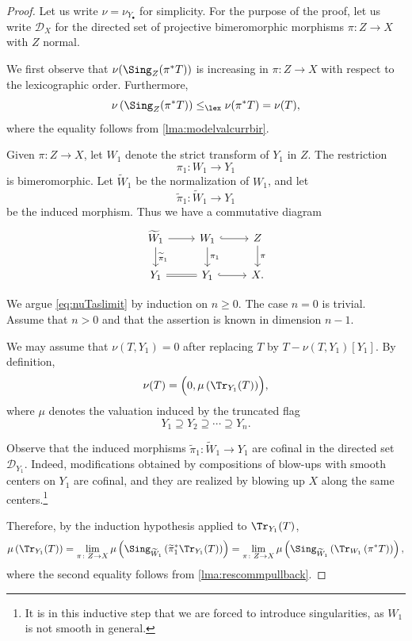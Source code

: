 \begin{proof}
Let us write $\nu=\nu_{Y_{\bullet}}$ for simplicity. For the purpose of the proof,
let us write $\mathcal{D}_X$ for the directed set of projective bimeromorphic
morphisms $\pi\colon Z\rightarrow X$ with $Z$ normal.


We first observe that $\nu(\Sing_Z(\pi^*T))$ is increasing in $\pi\colon Z\rightarrow X$ with respect to the lexicographic order. Furthermore,
\[
    \nu\left(\Sing_Z(\pi^*T)\right)\leq_{\lex} \nu(\pi^*T)=\nu(T),
\]
where the equality follows from \cref{lma:modelvalcurrbir}.

Given $\pi\colon Z\rightarrow X$, let $W_1$ denote the strict transform of $Y_1$ in
$Z$. The restriction
\[
    \pi_1\colon W_1\rightarrow Y_1
\]
is bimeromorphic. Let $\widetilde{W}_1$ be the normalization of $W_1$, and let
\[
    \widetilde{\pi}_1\colon \widetilde{W}_1\rightarrow Y_1
\]
be the induced morphism. Thus we have a commutative diagram
\[
\begin{tikzcd}
\widetilde{W}_1 \arrow[r] \arrow[d, "\widetilde{\pi}_1"] &
W_1 \arrow[r, hook] \arrow[d, "\pi_1"] &
Z \arrow[d, "\pi"] \\
Y_1 \arrow[r, Rightarrow, no head] &
Y_1 \arrow[r, hook] &
X.
\end{tikzcd}
\]

We argue \eqref{eq:nuTaslimit} by induction on $n\geq 0$. The case $n=0$ is trivial. Assume that
$n>0$ and that the assertion is known in dimension $n-1$.

We may assume that $\nu(T,Y_1)=0$ after replacing $T$ by $T-\nu(T,Y_1)[Y_1]$. By definition,
\[
    \nu(T)=\Bigl(0,\mu\left(\Tr_{Y_1}(T)\right)\Bigr),
\]
where $\mu$ denotes the valuation induced by the truncated flag
\[
    Y_1\supseteq Y_2\supseteq \cdots \supseteq Y_n.
\]

Observe that the induced morphisms $\widetilde{\pi}_1\colon \widetilde{W}_1\rightarrow Y_1$ are cofinal in the directed set $\mathcal{D}_{Y_1}$. Indeed, modifications obtained
by compositions of blow-ups with smooth centers on $Y_1$ are cofinal, and they are realized by blowing up $X$ along the same centers.\footnote{It is in this inductive
step that we are forced to introduce singularities, as $W_1$ is not smooth in general.}

Therefore, by the induction hypothesis applied to $\Tr_{Y_1}(T)$,
\[
    \mu\left(\Tr_{Y_1}(T)\right)
    =
    \lim_{\pi\colon Z\rightarrow X}
    \mu\left(
        \Sing_{\widetilde{W}_1}
        \left(\widetilde{\pi}_1^*\Tr_{Y_1}(T)\right)
    \right)=\lim_{\pi\colon Z\rightarrow X}
    \mu\left(
        \Sing_{\widetilde{W}_1}
        \left(\Tr_{W_1}\left(\pi^*T\right)\right)
    \right),
\]
where the second equality follows from \cref{lma:rescommpullback}.


\end{proof}
